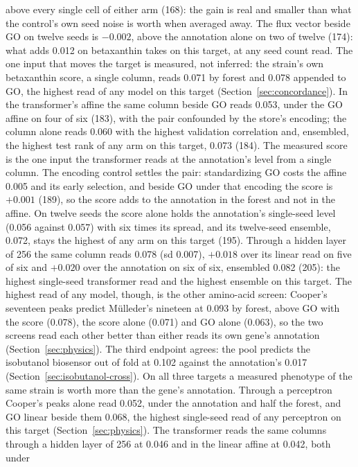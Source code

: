 above every single cell of either arm (168): the gain is real and smaller than what the
control's own seed noise is worth when averaged away. The flux vector beside GO on
twelve seeds is $-0.002$, above the annotation alone on two of twelve (174): what adds
0.012 on betaxanthin takes on this target, at any seed count read. The one input that
moves the target is measured, not inferred: the strain's own betaxanthin score, a single
column, reads 0.071 by forest and 0.078 appended to GO, the highest read of any model on
this target (Section~\ref{sec:concordance}). In the transformer's affine the same
column beside GO reads 0.053, under the GO affine on four of six (183), with the pair
confounded by the store's encoding; the column alone reads 0.060 with the highest
validation correlation and, ensembled, the highest test rank of any arm on this target,
0.073 (184). The measured score is the one input the transformer reads at the
annotation's level from a single column. The encoding control settles the pair:
standardizing GO costs the affine 0.005 and its early selection, and beside GO under
that encoding the score is $+0.001$ (189), so the score adds to the annotation in the
forest and not in the affine. On twelve seeds the score alone holds the annotation's
single-seed level (0.056 against 0.057) with six times its spread, and its twelve-seed
ensemble, 0.072, stays the highest of any arm on this target (195). Through a hidden
layer of 256 the same column reads 0.078 (sd 0.007), $+0.018$ over its linear read on
five of six and $+0.020$ over the annotation on six of six, ensembled 0.082 (205): the
highest single-seed transformer read and the highest ensemble on this target. The
highest read of any model, though, is the other amino-acid screen: Cooper's seventeen peaks predict
M\"ulleder's nineteen at 0.093 by forest, above GO with the score (0.078), the score
alone (0.071) and GO alone (0.063), so the two screens read each other better than
either reads its own gene's annotation (Section~\ref{sec:physics}). The third endpoint
agrees: the pool predicts the isobutanol biosensor out of fold at 0.102 against the
annotation's 0.017 (Section~\ref{sec:isobutanol-cross}). On all three targets a measured
phenotype of the same strain is worth more than the gene's annotation. Through a
perceptron Cooper's peaks alone read 0.052, under the annotation and half the forest,
and GO linear beside them 0.068, the highest single-seed read of any perceptron on
this target (Section~\ref{sec:physics}). The transformer reads the same columns
through a hidden layer of 256 at 0.046 and in the linear affine at 0.042, both under
